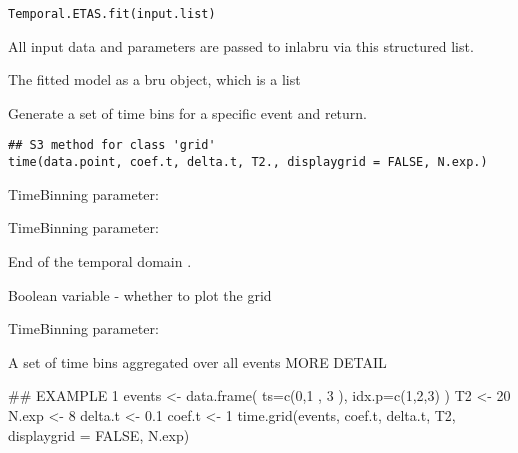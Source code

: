 \documentclass[letterpaper]{book}
\begin{document}
%
\begin{Usage}
\begin{verbatim}
Temporal.ETAS.fit(input.list)
\end{verbatim}
\end{Usage}
%
\begin{Arguments}
\begin{ldescription}
\item[\code{input.list}] All input data and parameters are passed to inlabru via this structured list.
\end{ldescription}
\end{Arguments}
%
\begin{Value}
The fitted model as a bru object, which is a list
\end{Value}
%
\begin{Description}\relax
Generate a set of time bins for a specific event and return.
\end{Description}
%
\begin{Usage}
\begin{verbatim}
## S3 method for class 'grid'
time(data.point, coef.t, delta.t, T2., displaygrid = FALSE, N.exp.)
\end{verbatim}
\end{Usage}
%
\begin{Arguments}
\begin{ldescription}
\item[\code{coef.t}] TimeBinning parameter:

\item[\code{delta.t}] TimeBinning parameter:

\item[\code{T2.}] End of the temporal domain .

\item[\code{displaygrid}] Boolean variable - whether to plot the grid

\item[\code{N.exp.}] TimeBinning parameter:
\end{ldescription}
\end{Arguments}
%
\begin{Value}
A set of time bins aggregated over all events MORE DETAIL
\end{Value}
%
\begin{Examples}
\begin{ExampleCode}
## EXAMPLE 1
events <- data.frame( ts=c(0,1 , 3 ), idx.p=c(1,2,3) )
T2 <- 20
N.exp <- 8
delta.t <- 0.1
coef.t <- 1
time.grid(events, coef.t, delta.t, T2, displaygrid = FALSE, N.exp)
\end{ExampleCode}
\end{Examples}
\end{document}
